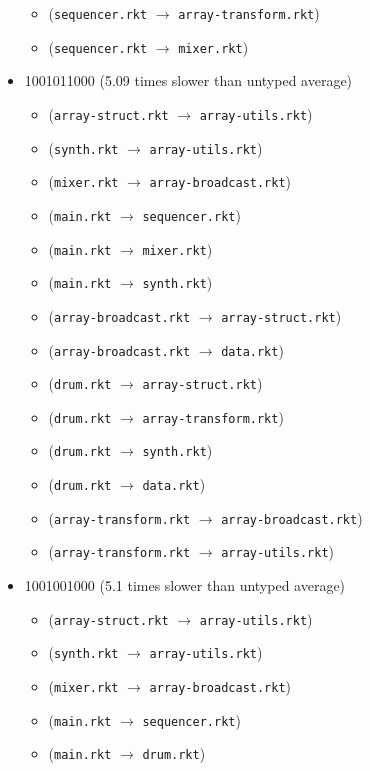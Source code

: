 \documentclass{article}
\newcommand{\mono}[1]{\texttt{#1}}
\begin{document}
\begin{itemize}
\begin{itemize}
  \item (\mono{sequencer.rkt} $\rightarrow$ \mono{array-transform.rkt})
  \item (\mono{sequencer.rkt} $\rightarrow$ \mono{mixer.rkt})
  \end{itemize}
\item 1001011000 (5.09 times slower than untyped average)
  \begin{itemize}
  \item (\mono{array-struct.rkt} $\rightarrow$ \mono{array-utils.rkt})
  \item (\mono{synth.rkt} $\rightarrow$ \mono{array-utils.rkt})
  \item (\mono{mixer.rkt} $\rightarrow$ \mono{array-broadcast.rkt})
  \item (\mono{main.rkt} $\rightarrow$ \mono{sequencer.rkt})
  \item (\mono{main.rkt} $\rightarrow$ \mono{mixer.rkt})
  \item (\mono{main.rkt} $\rightarrow$ \mono{synth.rkt})
  \item (\mono{array-broadcast.rkt} $\rightarrow$ \mono{array-struct.rkt})
  \item (\mono{array-broadcast.rkt} $\rightarrow$ \mono{data.rkt})
  \item (\mono{drum.rkt} $\rightarrow$ \mono{array-struct.rkt})
  \item (\mono{drum.rkt} $\rightarrow$ \mono{array-transform.rkt})
  \item (\mono{drum.rkt} $\rightarrow$ \mono{synth.rkt})
  \item (\mono{drum.rkt} $\rightarrow$ \mono{data.rkt})
  \item (\mono{array-transform.rkt} $\rightarrow$ \mono{array-broadcast.rkt})
  \item (\mono{array-transform.rkt} $\rightarrow$ \mono{array-utils.rkt})
  \end{itemize}
\item 1001001000 (5.1 times slower than untyped average)
  \begin{itemize}
  \item (\mono{array-struct.rkt} $\rightarrow$ \mono{array-utils.rkt})
  \item (\mono{synth.rkt} $\rightarrow$ \mono{array-utils.rkt})
  \item (\mono{mixer.rkt} $\rightarrow$ \mono{array-broadcast.rkt})
  \item (\mono{main.rkt} $\rightarrow$ \mono{sequencer.rkt})
  \item (\mono{main.rkt} $\rightarrow$ \mono{drum.rkt})

\end{itemize}
\end{itemize}
\end{document}

